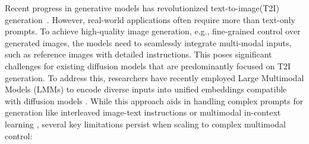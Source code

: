 Recent progress in generative models has revolutionized text-to-image(T2I) generation~\citep{2020DDPM,ldm,SDXL}. However, real-world applications often require more than text-only prompts.
To achieve high-quality image generation, e.g., fine-grained control over generated images, the models need to seamlessly integrate multi-modal inputs, such as reference images with detailed instructions.
This poses significant challenges for existing diffusion models that are predominantly focused on T2I generation.
To address this, researchers have recently employed Large Multimodal Models (LMMs) to encode diverse inputs into unified embeddings compatible with diffusion models \citep{Kosmos-G, emu2}. While this approach aids in handling complex prompts for generation like interleaved image-text instructions \citep{emu2} or multimodal in-context learning \citep{Kosmos-G,2024SeedX}, several key limitations persist when scaling to complex multimodal control:



